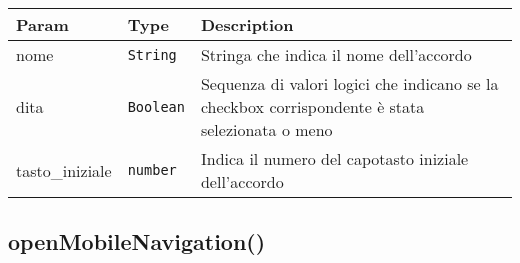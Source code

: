 \begin{tabularx}{\textwidth}{XXX}
\toprule
\begin{minipage}[b]{0.30\columnwidth}\raggedright
Param\strut
\end{minipage} & \begin{minipage}[b]{0.30\columnwidth}\raggedright
Type\strut
\end{minipage} & \begin{minipage}[b]{0.30\columnwidth}\raggedright
Description\strut
\end{minipage}\tabularnewline
\midrule
\endhead
\begin{minipage}[t]{0.30\columnwidth}\raggedright
nome\strut
\end{minipage} & \begin{minipage}[t]{0.30\columnwidth}\raggedright
\texttt{String}\strut
\end{minipage} & \begin{minipage}[t]{0.30\columnwidth}\raggedright
Stringa che indica il nome dell'accordo\strut
\end{minipage}\tabularnewline
\begin{minipage}[t]{0.30\columnwidth}\raggedright
dita\strut
\end{minipage} & \begin{minipage}[t]{0.30\columnwidth}\raggedright
\texttt{Boolean}\strut
\end{minipage} & \begin{minipage}[t]{0.30\columnwidth}\raggedright
Sequenza di valori logici che indicano se la checkbox corrispondente è
stata selezionata o meno\strut
\end{minipage}\tabularnewline
\begin{minipage}[t]{0.30\columnwidth}\raggedright
tasto\_iniziale\strut
\end{minipage} & \begin{minipage}[t]{0.30\columnwidth}\raggedright
\texttt{number}\strut
\end{minipage} & \begin{minipage}[t]{0.30\columnwidth}\raggedright
Indica il numero del capotasto iniziale dell'accordo\strut
\end{minipage}\tabularnewline
\bottomrule
\end{tabularx}

\protect\hypertarget{openMobileNavigation}{}{}

\hypertarget{openmobilenavigation}{%
\subsection{openMobileNavigation()}\label{openmobilenavigation}}

